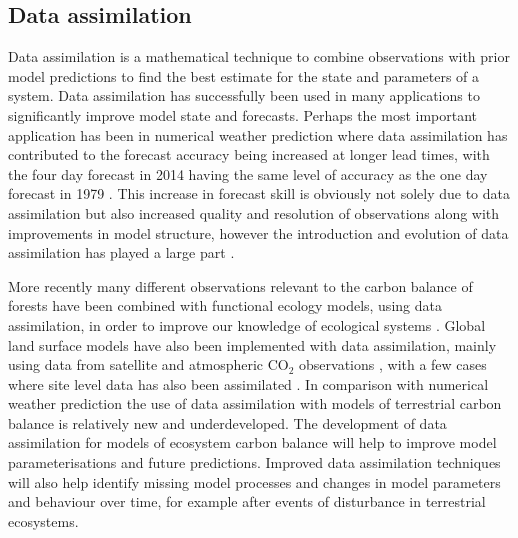 

\subsection{Data assimilation}

Data assimilation is a mathematical technique to combine observations with prior model predictions to find the best estimate for the state and parameters of a system. Data assimilation has successfully been used in many applications to significantly improve model state and forecasts. Perhaps the most important application has been in numerical weather prediction where data assimilation has contributed to the forecast accuracy being increased at longer lead times, with the four day forecast in 2014 having the same level of accuracy as the one day forecast in 1979 \citep{bauer2015quiet}. This increase in forecast skill is obviously not solely due to data assimilation but also increased quality and resolution of observations along with improvements in model structure, however the introduction and evolution of data assimilation has played a large part \citep{dee2011era}.

More recently many different observations relevant to the carbon balance of forests have been combined with functional ecology models, using data assimilation, in order to improve our knowledge of ecological systems \citep{zobitz2011primer, fox2009reflex, richardson2010estimating, Quaife2008, Zobitz2014, Niu2014}. Global land surface models have also been implemented with data assimilation,  mainly using data from satellite and atmospheric $\text{CO}_{2}$ observations \citep{Kaminski2013, scholze2007propagating}, with a few cases where site level data has also been assimilated \citep{Verbeeck2011, Bacour2015}. In comparison with numerical weather prediction the use of data assimilation with models of terrestrial carbon balance is relatively new and underdeveloped. The development of data assimilation for models of ecosystem carbon balance will help to improve model parameterisations and future predictions. Improved data assimilation techniques will also help identify missing model processes and changes in model parameters and behaviour over time, for example after events of disturbance in terrestrial ecosystems.
  
